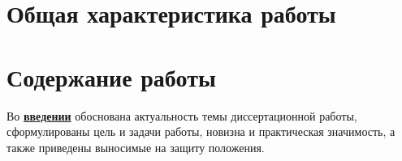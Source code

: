 \section*{Общая характеристика работы}

\newcommand{\actuality}{\pdfbookmark[1]{Актуальность}{actuality}\underline{\textbf{\actualityTXT}}}
\newcommand{\progress}{\pdfbookmark[1]{Разработанность темы}{progress}\underline{\textbf{\progressTXT}}}
\newcommand{\aim}{\pdfbookmark[1]{Цели}{aim}\underline{{\textbf\aimTXT}}}
\newcommand{\tasks}{\pdfbookmark[1]{Задачи}{tasks}\underline{\textbf{\tasksTXT}}}
\newcommand{\aimtasks}{\pdfbookmark[1]{Цели и задачи}{aimtasks}\aimtasksTXT}
\newcommand{\novelty}{\pdfbookmark[1]{Научная новизна}{novelty}\underline{\textbf{\noveltyTXT}}}
\newcommand{\influence}{\pdfbookmark[1]{Практическая значимость}{influence}\underline{\textbf{\influenceTXT}}}
\newcommand{\methods}{\pdfbookmark[1]{Методология и методы исследования}{methods}\underline{\textbf{\methodsTXT}}}
\newcommand{\defpositions}{\pdfbookmark[1]{Положения, выносимые на защиту}{defpositions}\underline{\textbf{\defpositionsTXT}}}
\newcommand{\reliability}{\pdfbookmark[1]{Достоверность}{reliability}\underline{\textbf{\reliabilityTXT}}}
\newcommand{\probation}{\pdfbookmark[1]{Апробация}{probation}\underline{\textbf{\probationTXT}}}
\newcommand{\contribution}{\pdfbookmark[1]{Личный вклад}{contribution}\underline{\textbf{\contributionTXT}}}
\newcommand{\publications}{\pdfbookmark[1]{Публикации}{publications}\underline{\textbf{\publicationsTXT}}}




\section*{Содержание работы}
Во \underline{\textbf{введении}} обоснована актуальность темы диссертационной работы, сформулированы цель и задачи работы, новизна и практическая значимость, а также приведены выносимые на защиту положения. 

